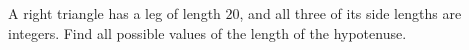 A right triangle has a leg of length $20$, and all three of its side lengths are integers. Find all possible values of the length of the hypotenuse.
